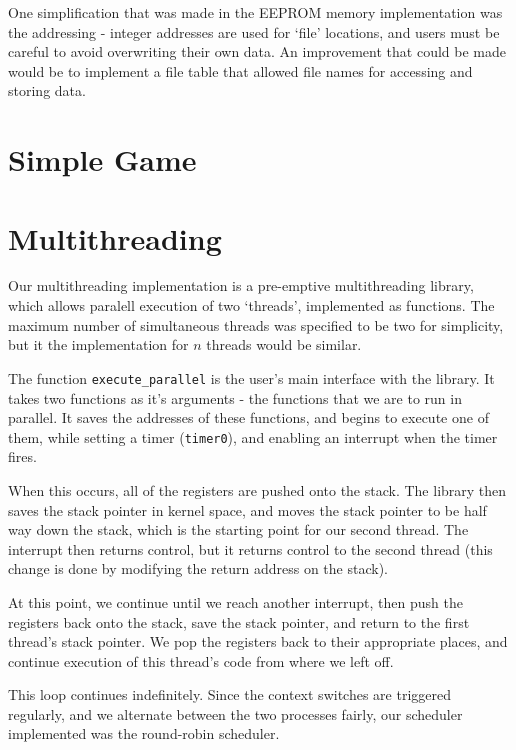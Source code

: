\documentclass[a4paper]{article}
\begin{document}
One simplification that was made in the EEPROM memory implementation was the addressing - integer addresses are used for `file' locations, and users must be careful to avoid overwriting their own data. An improvement that could be made would be to implement a file table that allowed file names for accessing and storing data.
\section*{Simple Game}

\section*{Multithreading}
Our multithreading implementation is a pre-emptive multithreading library, which allows paralell execution of two `threads', implemented as functions. The maximum number of simultaneous threads was specified to be two for simplicity, but it the implementation for $n$ threads would be similar.

The function \texttt{execute\_parallel} is the user's main interface with the library. It takes two functions as it's arguments - the functions that we are to run in parallel. It saves the addresses of these functions, and begins to execute one of them, while setting a timer (\texttt{timer0}), and enabling an interrupt when the timer fires.

When this occurs, all of the registers are pushed onto the stack. The library then saves the stack pointer in kernel space, and moves the stack pointer to be half way down the stack, which is the starting point for our second thread. The interrupt then returns control, but it returns control to the second thread (this change is done by modifying the return address on the stack).

At this point, we continue until we reach another interrupt, then push the registers back onto the stack, save the stack pointer, and return to the first thread's stack pointer. We pop the registers back to their appropriate places, and continue execution of this thread's code from where we left off.

This loop continues indefinitely. Since the context switches are triggered regularly, and we alternate between the two processes fairly, our scheduler implemented was the round-robin scheduler.
\end{document}
